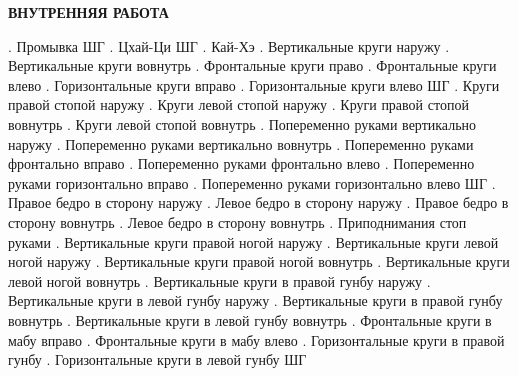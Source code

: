 \nopagenumbers
\centerline{\bf ВНУТРЕННЯЯ РАБОТА}
\obeylines
\leavevmode{}. Промывка
ШГ
\leavevmode{}. Цхай-Ци
ШГ
\leavevmode{}. Кай-Хэ
\leavevmode{}. Вертикальные круги наружу
\leavevmode{}. Вертикальные круги вовнутрь
\leavevmode{}. Фронтальные круги право
\leavevmode{}. Фронтальные круги влево
\leavevmode{}. Горизонтальные круги вправо
\leavevmode{}. Горизонтальные круги влево
ШГ
\leavevmode{}. Круги правой стопой наружу
\leavevmode{}. Круги левой стопой наружу
\leavevmode{}. Круги правой стопой вовнутрь
\leavevmode{}. Круги левой стопой вовнутрь
\leavevmode{}. Попеременно руками вертикально наружу
\leavevmode{}. Попеременно руками вертикально вовнутрь
\leavevmode{}. Попеременно руками фронтально вправо
\leavevmode{}. Попеременно руками фронтально влево
\leavevmode{}. Попеременно руками горизонтально вправо
\leavevmode{}. Попеременно руками горизонтально влево
ШГ
\leavevmode{}. Правое бедро в сторону наружу
\leavevmode{}. Левое бедро в сторону наружу
\leavevmode{}. Правое бедро в сторону вовнутрь
\leavevmode{}. Левое бедро в сторону вовнутрь
\leavevmode{}. Приподнимания стоп руками
\leavevmode{}. Вертикальные круги правой ногой наружу
\leavevmode{}. Вертикальные круги левой ногой наружу
\leavevmode{}. Вертикальные круги правой ногой вовнутрь
\leavevmode{}. Вертикальные круги левой ногой вовнутрь
\leavevmode{}. Вертикальные круги в правой гунбу наружу
\leavevmode{}. Вертикальные круги в левой гунбу наружу
\leavevmode{}. Вертикальные круги в правой гунбу вовнутрь
\leavevmode{}. Вертикальные круги в левой гунбу вовнутрь
\leavevmode{}. Фронтальные круги в мабу вправо
\leavevmode{}. Фронтальные круги в мабу влево
\leavevmode{}. Горизонтальные круги в правой гунбу
\leavevmode{}. Горизонтальные круги в левой гунбу
ШГ
\bye
